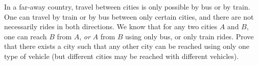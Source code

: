 In a far-away country, travel between cities is only possible by bus or by train. One can travel by train or by bus between only certain cities, and there are not necessarily rides in both directions. We know that for any two cities $A$ and $B$, one can reach $B$ from $A$, \textit{or} $A$ from $B$ using only bus, or only train rides. Prove that there exists a city such that any other city can be reached using only one type of vehicle (but different cities may be reached with different vehicles).
